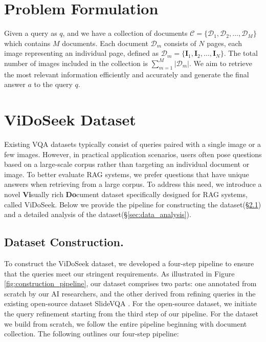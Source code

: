 \section{Problem Formulation}
\label{sec:problem_define}
Given a query as $q$, and we have a collection of documents $\mathcal{C} = \{ \mathcal{D}_1, \mathcal{D}_2, \ldots, \mathcal{D}_M \}$ which contains $M$ documents. Each document $\mathcal{D}_m$ consists of $N$ pages, each image representing an individual page, defined as $\mathcal{D}_m = \{ \mathbf{I}_1, \mathbf{I}_2, \ldots, \mathbf{I}_N \}$. The total number of images included in the collection is $\sum_{m=1}^{M} |\mathcal{D}_m|$. We aim to retrieve the most relevant information efficiently and accurately and generate the final answer $a$ to the query $q$.

\section{ViDoSeek Dataset}
\label{sec:dataset}

Existing VQA datasets typically consist of queries paired with a single image or a few images. However, in practical application scenarios, users often pose questions based on a large-scale corpus rather than targeting an individual document or image. To better evaluate RAG systems, we prefer questions that have unique answers when retrieving from a large corpus. 
To address this need, we introduce a novel \textbf{Vi}sually rich \textbf{Do}cument dataset specifically designed for RAG systems, called ViDoSeek. 
Below we provide the pipeline for constructing the dataset(\S \ref{sec:data_pipeline})  and a detailed analysis of the dataset(\S \ref{sec:data_analysis}).

\subsection{Dataset Construction.}
\label{sec:data_pipeline}
To construct the ViDoSeek dataset, we developed a four-step pipeline to ensure that the queries meet our stringent requirements. As illustrated in Figure \ref{fig:construction_pipeline}, our dataset comprises two parts: one annotated from scratch by our AI researchers, and the other derived from refining queries in the existing open-source dataset SlideVQA \cite{tanaka2023slidevqa}. 
For the open-source dataset, we initiate the query refinement starting from the third step of our pipeline. For the dataset we build from scratch, we follow the entire pipeline beginning with document collection. The following outlines our four-step pipeline:
